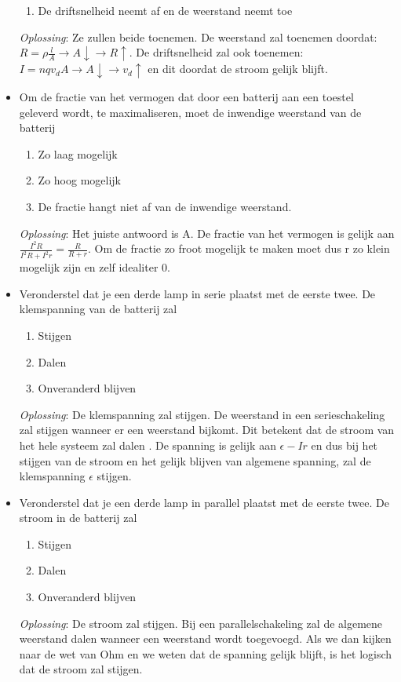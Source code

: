 \documentclass[12pt,a4paper]{article}
\begin{document}
\begin{itemize}
\begin{enumerate}[label=\alph*]
		\item De driftsnelheid neemt af en de weerstand neemt toe
	\end{enumerate}
	\textit{Oplossing}: Ze zullen beide toenemen. De weerstand zal toenemen doordat: \(R = \rho\frac{l}{A} \rightarrow A\downarrow \rightarrow R\uparrow\). De driftsnelheid zal ook toenemen: \(I = nqv_dA \rightarrow A\downarrow \rightarrow v_d\uparrow\) en dit doordat de stroom gelijk blijft. 
	\item Om de fractie van het vermogen dat door een batterij aan een toestel geleverd wordt, te maximaliseren, moet de inwendige weerstand van de batterij
	\begin{enumerate}[label=\alph*]
		\item Zo laag mogelijk
		\item Zo hoog mogelijk
		\item De fractie hangt niet af van de inwendige weerstand.
	\end{enumerate}
	\textit{Oplossing}: Het juiste antwoord is A. De fractie van het vermogen is gelijk aan \(\frac{I^2R}{I^2R + I^2r} = \frac{R}{R+r}\). Om de fractie zo froot mogelijk te maken moet dus r zo klein mogelijk zijn en zelf idealiter 0.
	\item Veronderstel dat je een derde lamp in serie plaatst met de eerste twee. De klemspanning van de batterij zal
	\begin{enumerate}[label=\alph*]
		\item Stijgen
		\item Dalen
		\item Onveranderd blijven
	\end{enumerate}
	\textit{Oplossing}: De klemspanning zal stijgen. De weerstand in een serieschakeling zal stijgen wanneer er een weerstand bijkomt. Dit betekent dat de stroom van het hele systeem zal dalen . De spanning is gelijk aan \(\epsilon - Ir\) en dus bij het stijgen van de stroom en het gelijk blijven van algemene spanning, zal de klemspanning $\epsilon$ stijgen. 
	\item Veronderstel dat je een derde lamp in parallel plaatst met de eerste twee. De stroom in de batterij zal
	\begin{enumerate}[label=\alph*]
		\item Stijgen
		\item Dalen
		\item Onveranderd blijven
	\end{enumerate}
	\textit{Oplossing}: De stroom zal stijgen. Bij een parallelschakeling zal de algemene weerstand dalen wanneer een weerstand wordt toegevoegd. Als we dan kijken naar de wet van Ohm en we weten dat de spanning gelijk blijft, is het logisch dat de stroom zal stijgen. 

\end{itemize}
\end{document}
